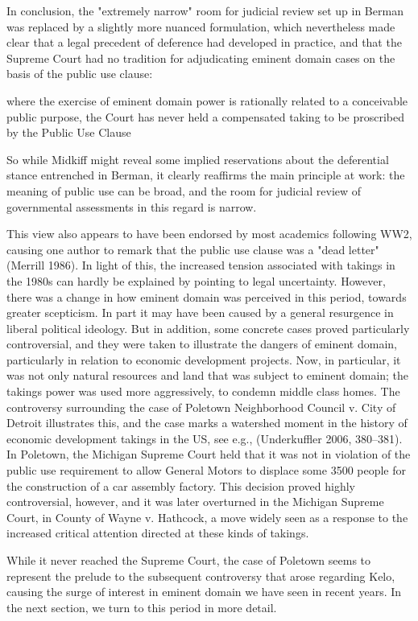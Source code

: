 In conclusion, the "extremely narrow" room for judicial review set up in Berman was replaced by a  slightly more nuanced formulation, which nevertheless made clear that a legal precedent of deference had developed in practice, and that the Supreme Court had no tradition for  adjudicating eminent domain cases on the basis of the public use clause:

where the exercise of eminent domain power is rationally related to a conceivable public purpose, the Court has never held a compensated taking to be proscribed by the Public Use Clause

So while Midkiff might reveal some implied reservations about the deferential stance entrenched in Berman, it clearly reaffirms the main principle at work:  the meaning of public use can be broad, and the room for judicial review of governmental assessments in this regard is narrow.

This view also appears to have been endorsed by most academics following WW2, causing one author to remark that the public use clause was a "dead letter" (Merrill 1986). In light of this, the increased tension associated with takings  in the 1980s can hardly be explained by pointing to legal uncertainty. However, there was a change in how eminent domain was perceived in this period, towards greater scepticism. In part it may have been caused by a general resurgence in liberal political ideology. But in addition, some concrete cases proved particularly controversial, and they were taken to illustrate the dangers of eminent domain, particularly in relation to economic development projects. Now, in particular, it was not only natural resources and land that was subject to eminent domain; the takings power was used more aggressively, to condemn middle class homes.
The controversy surrounding the case of Poletown Neighborhood Council v. City of Detroit  illustrates this, and the case marks a watershed moment in the history of  economic development takings in the US, see e.g., (Underkuffler 2006, 380–381). In Poletown, the Michigan Supreme Court held that it was not in violation of the public use requirement to allow General Motors to displace some 3500 people for the construction of a car assembly factory.  This decision proved highly controversial, however, and it was later overturned in the Michigan Supreme Court, in County of Wayne v. Hathcock, a move widely seen as a response to the increased critical attention directed at these kinds of takings. 

While it never reached the Supreme Court, the case of Poletown seems to represent the prelude to the subsequent controversy that arose regarding Kelo, causing the surge of interest in eminent domain we have seen in recent years. In the next section, we turn to this period in more detail.

